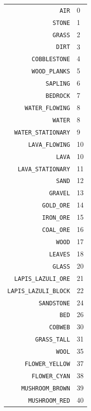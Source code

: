 \documentclass[twocolumn]{geocraft-worksheet}
\begin{document}
\begin{center}
\begin{supertabular} { | r | l | }
\verb|AIR|                &    0 \\
\verb|STONE|              &    1 \\
\verb|GRASS|               &    2 \\
\verb|DIRT|               &    3 \\
\verb|COBBLESTONE|         &    4 \\
\verb|WOOD_PLANKS|         &    5 \\
\verb|SAPLING|             &    6 \\
\verb|BEDROCK|             &    7 \\
\verb|WATER_FLOWING|       &    8 \\
\verb|WATER|               &    8 \\
\verb|WATER_STATIONARY|    &    9 \\
\verb|LAVA_FLOWING|        &   10 \\
\verb|LAVA|                &   10 \\
\verb|LAVA_STATIONARY|     &   11 \\
\verb|SAND|                &   12 \\
\verb|GRAVEL|              &   13 \\
\verb|GOLD_ORE|            &   14 \\
\verb|IRON_ORE|            &   15 \\
\verb|COAL_ORE|            &   16 \\
\verb|WOOD|                &   17 \\
\verb|LEAVES|              &   18 \\
\verb|GLASS|               &   20 \\
\verb|LAPIS_LAZULI_ORE|    &   21 \\
\verb|LAPIS_LAZULI_BLOCK|  &   22 \\
\verb|SANDSTONE|           &   24 \\
\verb|BED|                 &   26 \\
\verb|COBWEB|              &   30 \\
\verb|GRASS_TALL|          &   31 \\
\verb|WOOL|                &   35 \\
\verb|FLOWER_YELLOW|       &   37 \\
\verb|FLOWER_CYAN|         &   38 \\
\verb|MUSHROOM_BROWN|      &   39 \\
\verb|MUSHROOM_RED|        &   40 \\

\end{supertabular}
\end{center}
\end{document}
